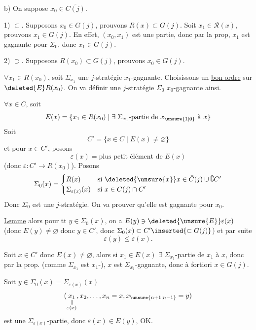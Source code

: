 b) On suppose $x_0\in\overline{C(j)}$.

1) $\subset$. Supposons $x_0\in G(j)$, prouvons $R(x)\subset G(j)$. Soit $x_1\in\mathcal R(x)$, prouvons $x_1\in G(j)$. En effet,  $(x_0,x_1)$ est une partie, donc par la prop, $x_1$ est gagnante pour $\Sigma_0$, donc $x_1\in G(j)$.

2) $\supset$. Supposons $R(x_0)\subset G(j)$, prouvons $x_0\in G(j)$.

$\forall x_1\in R(x_0)$, soit $\Sigma_{x_1}$ une $j$-stratégie $x_1$-gagnante. Choisissons un \uline{bon ordre} sur $\deleted{E}R(x_0)$. On va définir une $j$-stratégie $\Sigma_0$ $x_0$-gagnante ainsi.

$\forall x\in C$, soit
\[
 E(x)=\{x_1\in R(x_0)\mid\exists\ \Sigma_{x_1}\text{-partie de }x_{\unsure{1|0}}\text{ à }x\}
\]
Soit
\[
 C'=\{x\in C\mid E(x)\ne\varnothing\}
\]
et pour $x\in C'$, posons
\[
 \varepsilon(x)=\text{plus petit élément de } E(x)
\]
(donc $\varepsilon:C'\longrightarrow R(x_0)$). Posons
\[
 \Sigma_0(x)=\begin{cases}
 R(x) & \text{si } \deleted{\unsure{x}}x\in\bar C(j)\cup\complement C'\\
 \Sigma_{\varepsilon(x)}(x)&\text{si }x\in C(j)\cap C'
 \end{cases}
\]
Donc $\Sigma_0$ est une $j$-stratégie. On va prouver qu'elle est gagnante pour $x_0$.

\uline{Lemme}    alors  pour tt $y\in\Sigma_0(x)$, on a $E(y)\ni \deleted{\unsure{E}}\varepsilon(x)$ (donc $E(y)\ne\varnothing$ donc $y\in C'$, donc $\Sigma_0(x)\subset C'\inserted{\subset G(j)}$) et par suite
\[
 \varepsilon(y)\leq\varepsilon(x).
\]

\uline{}  Soit $x\in C'$ donc $E(x)\ne\varnothing$, alors si $x_1\in E(x)$ $\exists$  $\Sigma_{x_1}$-partie de $x_1$ à $x$, donc par la prop. (comme $\Sigma_{x_1}$ est $x_1$-), $x$ est $\Sigma_{x_1}$-gagnante, donc à fortiori $x\in G(j)$.

Soit $y\in\Sigma_0(x)=\Sigma_{\varepsilon(x)}(x)$
\[
 (\underset{\substack{\Vert\\ \varepsilon(x)}}{x_1},x_2,\ldots,x_n=x,x_{\unsure{n+1|n-1}}=y)
\]
est une $\Sigma_{\varepsilon(x)}$-partie, donc  $\varepsilon(x)\in E(y)$, OK.

